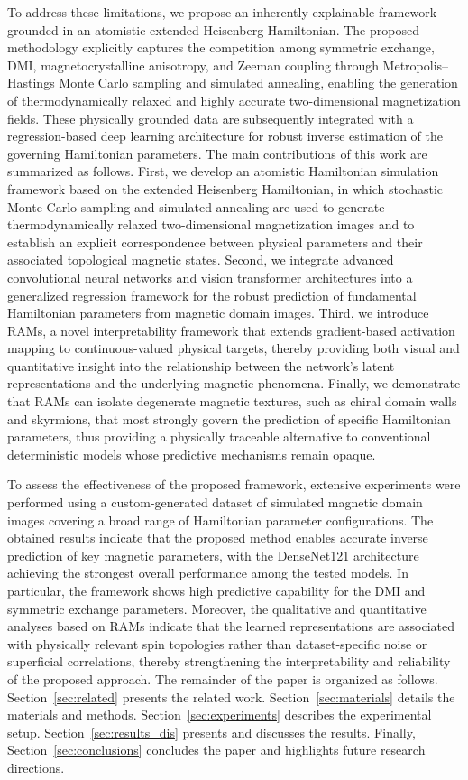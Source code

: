 \documentclass[final,5p,times,twocolumn]{elsarticle}
\begin{document}
To address these limitations, we propose an inherently explainable framework grounded in an atomistic extended Heisenberg Hamiltonian. The proposed methodology explicitly captures the competition among symmetric exchange, DMI, magnetocrystalline anisotropy, and Zeeman coupling through Metropolis–Hastings Monte Carlo sampling and simulated annealing, enabling the generation of thermodynamically relaxed and highly accurate two-dimensional magnetization fields. These physically grounded data are subsequently integrated with a regression-based deep learning architecture for robust inverse estimation of the governing Hamiltonian parameters. The main contributions of this work are summarized as follows. First, we develop an atomistic Hamiltonian simulation framework based on the extended Heisenberg Hamiltonian, in which stochastic Monte Carlo sampling and simulated annealing are used to generate thermodynamically relaxed two-dimensional magnetization images and to establish an explicit correspondence between physical parameters and their associated topological magnetic states. Second, we integrate advanced convolutional neural networks and vision transformer architectures into a generalized regression framework for the robust prediction of fundamental Hamiltonian parameters from magnetic domain images. Third, we introduce RAMs, a novel interpretability framework that extends gradient-based activation mapping to continuous-valued physical targets, thereby providing both visual and quantitative insight into the relationship between the network’s latent representations and the underlying magnetic phenomena. Finally, we demonstrate that RAMs can isolate degenerate magnetic textures, such as chiral domain walls and skyrmions, that most strongly govern the prediction of specific Hamiltonian parameters, thus providing a physically traceable alternative to conventional deterministic models whose predictive mechanisms remain opaque.

To assess the effectiveness of the proposed framework, extensive experiments were performed using a custom-generated dataset of simulated magnetic domain images covering a broad range of Hamiltonian parameter configurations. The obtained results indicate that the proposed method enables accurate inverse prediction of key magnetic parameters, with the DenseNet121 architecture achieving the strongest overall performance among the tested models. In particular, the framework shows high predictive capability for the DMI and symmetric exchange parameters. Moreover, the qualitative and quantitative analyses based on RAMs indicate that the learned representations are associated with physically relevant spin topologies rather than dataset-specific noise or superficial correlations, thereby strengthening the interpretability and reliability of the proposed approach. The remainder of the paper is organized as follows. Section~\ref{sec:related} presents the related work. Section~\ref{sec:materials} details the materials and methods. Section~\ref{sec:experiments} describes the experimental setup. Section~\ref{sec:results_dis} presents and discusses the results. Finally, Section~\ref{sec:conclusions} concludes the paper and highlights future research directions.
\end{document}
